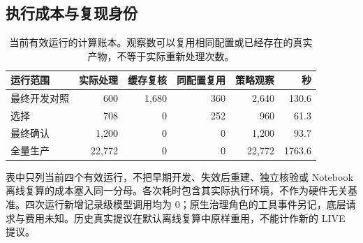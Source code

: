 \subsection{执行成本与复现身份}
\begin{table}[H]\centering\small
\caption{当前有效运行的计算账本。观察数可以复用相同配置或已经存在的真实产物，不等于实际重新处理次数。}
\begin{tabularx}{\linewidth}{@{}Yrrrr@{\hspace{1.4em}}r@{}}\toprule 运行范围 & 实际处理 & 缓存复核 & 同配置复用 & 策略观察 & 秒 \\ \midrule
最终开发对照 & 600 & 1,680 & 360 & 2,640 & 130.6 \\
选择 & 708 & 0 & 252 & 960 & 61.3 \\
最终确认 & 1,200 & 0 & 0 & 1,200 & 93.7 \\
全量生产 & 22,772 & 0 & 0 & 22,772 & 1763.6 \\
\bottomrule\end{tabularx}\end{table}

表中只列当前四个有效运行，不把早期开发、失效后重建、独立核验或 Notebook 离线复算的成本塞入同一分母。各次耗时包含其实际执行环境，不作为硬件无关基准。四次运行新增记录级模型调用均为 0；原生治理角色的工具事件另记，底层请求与费用未知。历史真实提议在默认离线复算中原样重用，不能计作新的 LIVE 提议。
